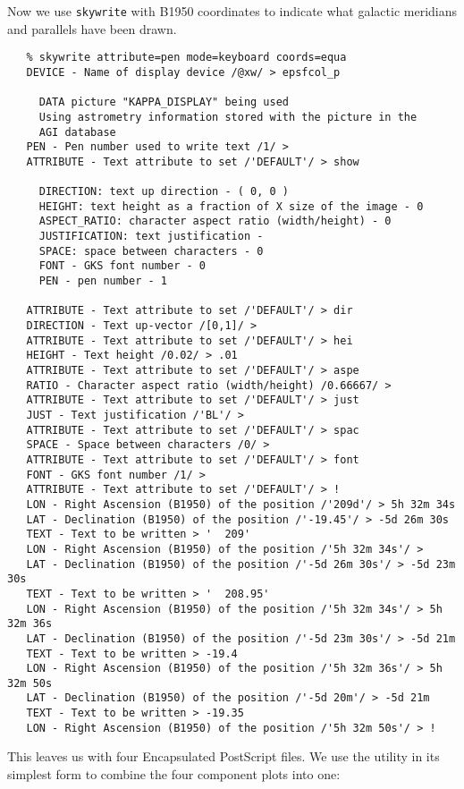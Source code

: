    Now we use {\tt skywrite} with B1950 coordinates to indicate what
   galactic meridians and parallels have been drawn.

\begin{verbatim}
   % skywrite attribute=pen mode=keyboard coords=equa
   DEVICE - Name of display device /@xw/ > epsfcol_p

     DATA picture "KAPPA_DISPLAY" being used
     Using astrometry information stored with the picture in the
     AGI database
   PEN - Pen number used to write text /1/ > 
   ATTRIBUTE - Text attribute to set /'DEFAULT'/ > show

     DIRECTION: text up direction - ( 0, 0 )
     HEIGHT: text height as a fraction of X size of the image - 0
     ASPECT_RATIO: character aspect ratio (width/height) - 0
     JUSTIFICATION: text justification -
     SPACE: space between characters - 0
     FONT - GKS font number - 0
     PEN - pen number - 1

   ATTRIBUTE - Text attribute to set /'DEFAULT'/ > dir
   DIRECTION - Text up-vector /[0,1]/ > 
   ATTRIBUTE - Text attribute to set /'DEFAULT'/ > hei
   HEIGHT - Text height /0.02/ > .01
   ATTRIBUTE - Text attribute to set /'DEFAULT'/ > aspe
   RATIO - Character aspect ratio (width/height) /0.66667/ > 
   ATTRIBUTE - Text attribute to set /'DEFAULT'/ > just
   JUST - Text justification /'BL'/ > 
   ATTRIBUTE - Text attribute to set /'DEFAULT'/ > spac
   SPACE - Space between characters /0/ > 
   ATTRIBUTE - Text attribute to set /'DEFAULT'/ > font
   FONT - GKS font number /1/ > 
   ATTRIBUTE - Text attribute to set /'DEFAULT'/ > !
   LON - Right Ascension (B1950) of the position /'209d'/ > 5h 32m 34s
   LAT - Declination (B1950) of the position /'-19.45'/ > -5d 26m 30s
   TEXT - Text to be written > '  209'
   LON - Right Ascension (B1950) of the position /'5h 32m 34s'/ > 
   LAT - Declination (B1950) of the position /'-5d 26m 30s'/ > -5d 23m 30s
   TEXT - Text to be written > '  208.95'
   LON - Right Ascension (B1950) of the position /'5h 32m 34s'/ > 5h 32m 36s
   LAT - Declination (B1950) of the position /'-5d 23m 30s'/ > -5d 21m
   TEXT - Text to be written > -19.4
   LON - Right Ascension (B1950) of the position /'5h 32m 36s'/ > 5h 32m 50s
   LAT - Declination (B1950) of the position /'-5d 20m'/ > -5d 21m
   TEXT - Text to be written > -19.35
   LON - Right Ascension (B1950) of the position /'5h 32m 50s'/ > !
\end{verbatim}

   This leaves us with four Encapsulated PostScript files. We use the
{\tt {}}
   utility in its simplest form to combine the four
   component plots into one:

